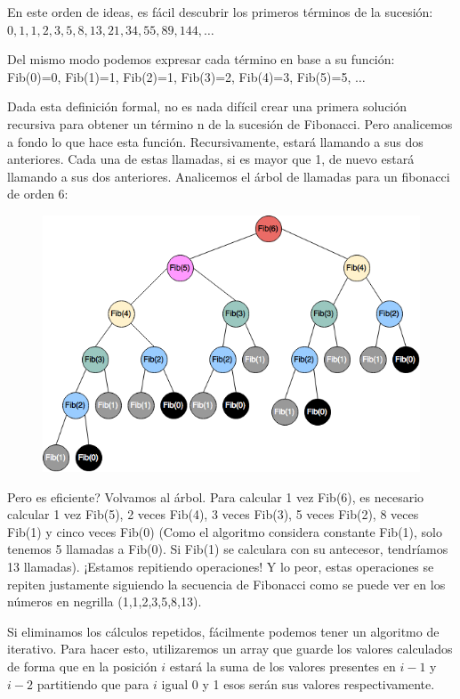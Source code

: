 En este orden de ideas, es fácil descubrir los primeros términos de la sucesión:\\ $0,1,1,2,3,5,8,13,21,34,55,89,144, \dots$ 

Del mismo modo podemos expresar cada término en base a su función:\\ Fib(0)=0, Fib(1)=1, Fib(2)=1, Fib(3)=2, Fib(4)=3, Fib(5)=5, $\dots$

Dada esta definición formal, no es nada difícil crear una primera solución recursiva para obtener un término n de la sucesión de Fibonacci. Pero analicemos a fondo lo que hace esta función. Recursivamente, estará llamando a sus dos anteriores. Cada una de estas llamadas, si es mayor que 1, de nuevo estará llamando a sus dos anteriores. Analicemos el árbol de llamadas para un fibonacci de orden 6:

\begin{figure}[!h]
	\centering
	\includegraphics[scale=0.50]{img/arbol-fibonacci.png}
	\label{fig:generalizacion-fibonacci-2}
\end{figure}

Pero es eficiente? Volvamos al árbol. Para calcular 1 vez Fib(6), es necesario calcular 1 vez Fib(5), 2 veces Fib(4), 3 veces Fib(3), 5 veces Fib(2), 8 veces Fib(1) y cinco veces Fib(0) (Como el algoritmo considera constante Fib(1), solo tenemos 5 llamadas a Fib(0). Si Fib(1) se calculara con su antecesor, tendríamos 13 llamadas). ¡Estamos repitiendo operaciones! Y lo peor, estas operaciones se repiten justamente siguiendo la secuencia de Fibonacci como se puede ver en los números en negrilla (1,1,2,3,5,8,13).

Si eliminamos los cálculos repetidos, fácilmente podemos tener un algoritmo de iterativo. Para hacer esto, utilizaremos un array que guarde los valores calculados de forma que en la posición $i$  estará la suma de los valores presentes en $i-1$ y $i-2$ partitiendo que para $i$ igual 0 y 1 esos serán sus valores respectivamente. 

